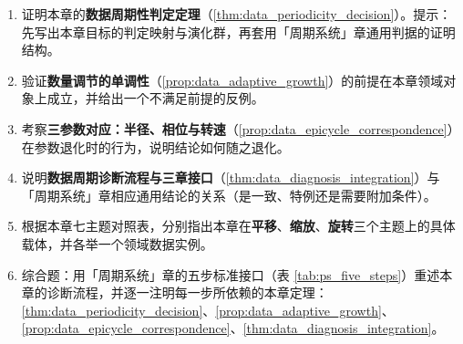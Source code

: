 \begin{enumerate}[leftmargin=3em, label=\textbf{题 \arabic*}]
    \item 证明本章的\textbf{数据周期性判定定理}（\ref{thm:data_periodicity_decision}）。提示：先写出本章目标的判定映射与演化群，再套用「周期系统」章通用判据的证明结构。

    \item 验证\textbf{数量调节的单调性}（\ref{prop:data_adaptive_growth}）的前提在本章领域对象上成立，并给出一个不满足前提的反例。

    \item 考察\textbf{三参数对应：半径、相位与转速}（\ref{prop:data_epicycle_correspondence}）在参数退化时的行为，说明结论如何随之退化。

    \item 说明\textbf{数据周期诊断流程与三章接口}（\ref{thm:data_diagnosis_integration}）与「周期系统」章相应通用结论的关系（是一致、特例还是需要附加条件）。

    \item 根据本章七主题对照表，分别指出本章在\textbf{平移}、\textbf{缩放}、\textbf{旋转}三个主题上的具体载体，并各举一个领域数据实例。

    \item 综合题：用「周期系统」章的五步标准接口（表 \ref{tab:ps_five_steps}）重述本章的诊断流程，并逐一注明每一步所依赖的本章定理：\ref{thm:data_periodicity_decision}、\ref{prop:data_adaptive_growth}、\ref{prop:data_epicycle_correspondence}、\ref{thm:data_diagnosis_integration}。
\end{enumerate}


